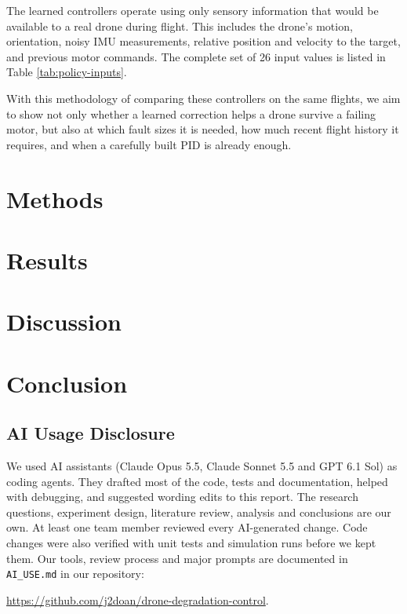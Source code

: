 \documentclass[12pt,letterpaper]{article}
\begin{document}
The learned controllers operate using only sensory information that would be available to a real drone during flight. This includes the drone's motion, orientation, noisy IMU measurements, relative position and velocity to the target, and previous motor commands. The complete set of 26 input values is listed in Table \ref{tab:policy-inputs}.

\begin{table}[htbp]
\caption{The 26 values the learned policies observe at each step}
\label{tab:policy-inputs}
\resizebox{0.7\linewidth}{!}{}
\end{table}

With this methodology of comparing these controllers on the same flights, we aim to show not only whether a learned correction helps a drone survive a failing motor, but also at which fault sizes it is needed, how much recent flight history it requires, and when a carefully built PID is already enough.

\section{Methods}

\section{Results}

\section{Discussion}

\section{Conclusion}




\clearpage
\makeappendix

\subsection{AI Usage Disclosure}
We used AI assistants (Claude Opus 5.5, Claude Sonnet 5.5 and GPT 6.1 Sol) as coding agents. They drafted most of the code, tests and documentation, helped with debugging, and suggested wording edits to this report. The research questions, experiment design, literature review, analysis and conclusions are our own. At least one team member reviewed every AI-generated change. Code changes were also verified with unit tests and simulation runs before we kept them. Our tools, review process and major prompts are documented in \texttt{AI\_USE.md} in our repository:

\url{https://github.com/j2doan/drone-degradation-control}.
\end{document}
